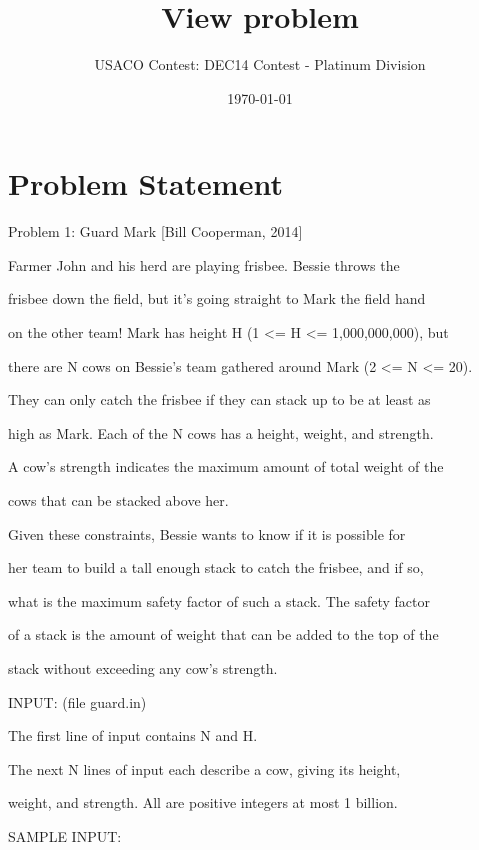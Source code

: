 \documentclass[12pt]{article}
\title{View problem}
\author{USACO Contest: DEC14 Contest - Platinum Division}
\date{\today}
\begin{document}
\maketitle

\section*{Problem Statement}

Problem 1: Guard Mark [Bill Cooperman, 2014]



Farmer John and his herd are playing frisbee.  Bessie throws the

frisbee down the field, but it's going straight to Mark the field hand

on the other team!  Mark has height H (1 <= H <= 1,000,000,000), but

there are N cows on Bessie's team gathered around Mark (2 <= N <= 20).

They can only catch the frisbee if they can stack up to be at least as

high as Mark.  Each of the N cows has a height, weight, and strength.

A cow's strength indicates the maximum amount of total weight of the

cows that can be stacked above her.  



Given these constraints, Bessie wants to know if it is possible for

her team to build a tall enough stack to catch the frisbee, and if so,

what is the maximum safety factor of such a stack.  The safety factor

of a stack is the amount of weight that can be added to the top of the

stack without exceeding any cow's strength.



INPUT: (file guard.in)



The first line of input contains N and H.



The next N lines of input each describe a cow, giving its height,

weight, and strength.  All are positive integers at most 1 billion.



SAMPLE INPUT:
\end{document}
